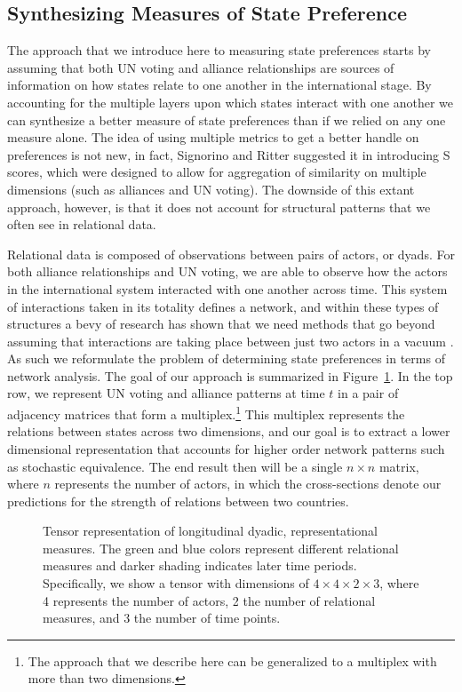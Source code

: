 \subsection*{Synthesizing Measures of State Preference}

The approach that we introduce here to measuring state preferences starts by assuming that both UN voting and alliance relationships are sources of information on how states relate to one another in the international stage. By accounting for the multiple layers upon which states interact with one another we can synthesize a better measure of state preferences than if we relied on any one measure alone. The idea of using multiple metrics to get a better handle on preferences is not new, in fact, Signorino and Ritter suggested it in introducing S scores, which were designed to allow for aggregation of similarity on multiple dimensions (such as alliances and UN voting). The downside of this extant approach, however, is that it does not account for structural patterns that we often see in relational data. 

Relational data is composed of observations between pairs of actors, or dyads. For both alliance relationships and UN voting, we are able to observe how the actors in the international system  interacted with one another across time. This system of interactions taken in its totality defines a network, and within these types of structures a bevy of research has shown that we need methods that go beyond assuming that interactions are taking place between just two actors in a vacuum \citep{wasserman:faust:1994,snijders:nowicki:1997}. As such we reformulate the problem of determining state preferences in terms of network analysis. The goal of our approach is summarized in Figure~\ref{fig:tensViz}. In the top row, we represent UN voting and alliance patterns at time $t$ in a pair of adjacency matrices that form a multiplex.\footnote{The approach that we describe here can be generalized to a multiplex with more than two dimensions.} This multiplex represents the relations between states across two dimensions, and our goal is to extract a lower dimensional representation that accounts for higher order network patterns such as stochastic equivalence. The end result then will be a single $n \times n$ matrix, where $n$ represents the number of actors, in which the cross-sections denote our predictions for the strength of relations between two countries.

\begin{figure}[ht]
	\centering
	\resizebox{.5\textwidth}{!}{}
	\caption{Tensor representation of longitudinal dyadic, representational measures. The green and blue colors represent different relational measures and darker shading indicates later time periods. Specifically, we show a tensor with dimensions of $4 \times 4 \times 2 \times 3$, where 4 represents the number of actors, 2 the number of relational measures, and 3 the number of time points.}
	\label{fig:tensViz}
\end{figure}

